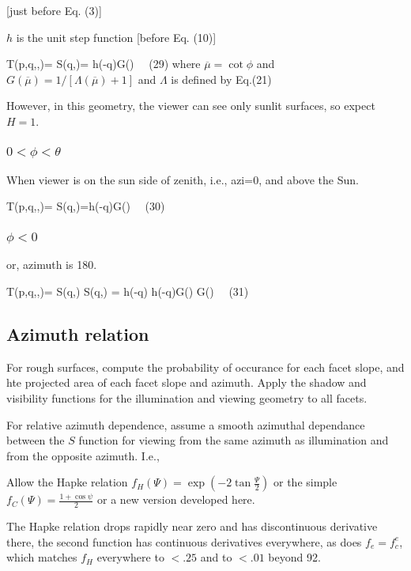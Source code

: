 \documentclass{article}
\begin{document}
[just before Eq. (3)]

$h$ is the unit step function [before Eq. (10)]  

\qbn T(p,q,\theta,\phi)= S(q,\phi)= h(\overline{\mu}-q)G(\overline{\mu}) \ \ (29) \qen
where $\overline{\mu} = \cot \phi $ 
and $ G(\overline{\mu}) =1 / \left[ \Lambda(\overline{\mu}) +1 \right] $
 and $ \Lambda$ is defined by Eq.(21) 

However, in this geometry, the viewer can see only sunlit surfaces, so expect $H=1$.

\subsubsection { $ 0 < \phi < \theta $ }   When viewer is on the sun side of zenith, i.e., azi=0, and above the Sun.

\qbn T(p,q,\theta,\phi)= S(q,\theta)=h(\mu-q)G(\mu) \ \ (30) \qen

\subsubsection { $\phi <  0 $ }  or, azimuth is 180\qd.

\qbn T(p,q,\theta,\phi)= S(q,\theta) \cdot S(q,\phi) = h(\mu-q) h(\overline{\mu}-q)G(\mu) G(\overline{\mu}) \ \ (31) \qen

\subsection{Azimuth relation  }  %

For rough surfaces, compute the probability of occurance for each facet slope,
and hte projected area of each facet slope and azimuth. Apply the shadow and
visibility functions for the illumination and viewing geometry to all facets.

For relative azimuth dependence, assume a smooth azimuthal dependance between the $S$ function for viewing  from the same azimuth as illumination and from the opposite azimuth. I.e., 




Allow the Hapke relation 
$f_H(\Psi)=\exp \left( -2 \tan \frac{\Psi}{2} \right)$ 
or the simple $f_C(\Psi)=\frac{1+ \cos  \psi}{2}$ or a new version developed here.
 
The Hapke relation drops rapidly near zero and has discontinuous derivative there, 
the second function has continuous derivatives everywhere, as does $f_e=f_c^e$, 
which matches $f_H$ everywhere to $<.25$ and to $< .01$ beyond 92\qd.
\end{document}
